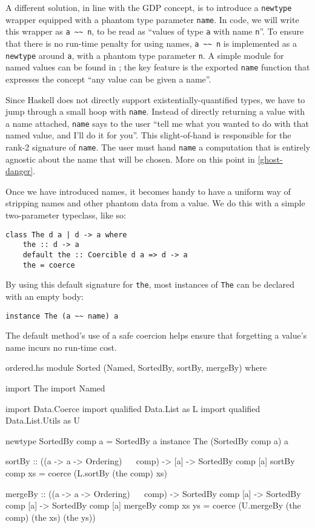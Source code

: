 \documentclass[format=sigplan, review=false, screen=true]{acmart}
\begin{document}
A different solution, in line with the GDP concept, is to introduce a \texttt{newtype} wrapper equipped with
a phantom type parameter \texttt{name}.
In code, we will write this wrapper as \verb|a ~~ n|, to be read as
``values of type \texttt{a} with name \texttt{n}''. To ensure that there is no
run-time penalty for using names, \verb|a ~~ n| is implemented as a \texttt{newtype}
around \texttt{a}, with a phantom type parameter \texttt{n}. A simple module for named values
can be found in ; the key feature is the exported \texttt{name}
function that expresses the concept ``any value can be given a name''.

Since Haskell does not directly support existentially-quantified types, we have to jump through
a small hoop with \texttt{name}. Instead of directly returning a value with a name attached,
\texttt{name} says to the user ``tell me what you wanted to do with that named value,
and I'll do it for you''. This slight-of-hand is responsible for the rank-2
signature of \texttt{name}. The user must hand \texttt{name} a computation that is
entirely agnostic about the name that will be chosen. More on this point in \cref{ghost-danger}.

Once we have introduced names, it becomes handy to have a uniform way of stripping names
and other phantom data from a value. We do this with a simple two-parameter typeclass,
like so:
\begin{verbatim}
class The d a | d -> a where
    the :: d -> a
    default the :: Coercible d a => d -> a
    the = coerce
\end{verbatim}
By using this default signature for \texttt{the}, most instances of \texttt{The}
can be declared with an empty body:
\begin{verbatim}
instance The (a ~~ name) a
\end{verbatim}
The default method's use of a safe coercion helps ensure that forgetting a value's name 
incurs no run-time cost.

\begin{filecontents*}{ordered.hs}
module Sorted (Named, SortedBy, sortBy, mergeBy) where   

import The
import Named

import           Data.Coerce
import qualified Data.List       as L
import qualified Data.List.Utils as U

newtype SortedBy comp a = SortedBy a
instance The (SortedBy comp a) a
  
sortBy :: ((a -> a -> Ordering) ~~ comp)
       -> [a]
       -> SortedBy comp [a]
sortBy comp xs = coerce (L.sortBy (the comp) xs)

mergeBy :: ((a -> a -> Ordering) ~~ comp)
        -> SortedBy comp [a]
        -> SortedBy comp [a]
        -> SortedBy comp [a]
mergeBy comp xs ys =
  coerce (U.mergeBy (the comp) (the xs) (the ys))        
\end{filecontents*}
\end{document}

